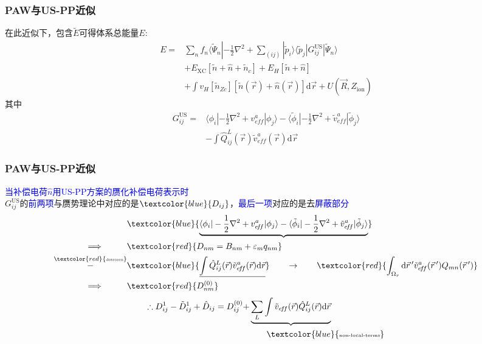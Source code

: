 \frame
{
	\frametitle{\textrm{PAW}与\textrm{US-PP}近似}
	在此近似下，包含$\tilde E$可得体系总能量$E$:
	\begin{displaymath}
		\begin{aligned}
			E=&\sum_nf_n\langle\tilde\Psi_n|-\frac12\nabla^2+\sum_{(ij)}|\tilde p_i\rangle\langle\tilde p_j|G_{ij}^{\mathrm{US}}|\tilde\Psi_n\rangle\\
			&+E_{\mathrm{XC}}[\tilde n+\hat n+\tilde n_c]+E_H[\tilde n+\hat n]\\
			&+\int v_H[\tilde n_{Zc}][\tilde n(\vec r)+\hat n(\vec r)]\mathrm{d}\vec r+U(\vec R,Z_{\mathrm{ion}})
		\end{aligned}
	\end{displaymath}
	其中
	\begin{displaymath}
		\begin{aligned}
			G_{ij}^{\mathrm{US}}=&\langle\phi_i|-\frac12\nabla^2+v_{e\!f\!f}^a|\phi_j\rangle-\langle\tilde\phi_i|-\frac12\nabla^2+\tilde v_{e\!f\!f}^a|\tilde\phi_j\rangle\\
			&-\int\hat Q_{ij}^L(\vec r)\tilde v_{e\!f\!f}^a(\vec r)\mathrm{d}\vec r
		\end{aligned}
	\end{displaymath}
}


\frame
{
	\frametitle{\textrm{PAW}与\textrm{US-PP}近似}
	\textcolor{blue}{当补偿电荷$\hat n$用\textrm{US-PP}方案的赝化补偿电荷表示时}\\%
	$G_{ij}^{\mathrm{US}}$的\textcolor{blue}{前两项}与赝势理论中对应的是$\textcolor{blue}{D_{ij}}$，\textcolor{blue}{最后一项}对应的是去\textcolor{blue}{屏蔽部分}
	\begin{displaymath}
		\begin{aligned}
			&\textcolor{blue}{\underbrace{\langle\phi_i|-\frac12\nabla^2+v_{e\!f\!f}^a|\phi_j\rangle-\langle\tilde\phi_i|-\frac12\nabla^2+\tilde v_{e\!f\!f}^a|\tilde\phi_j\rangle}}\\
			\Longrightarrow\quad\qquad&\textcolor{red}{D_{nm}=B_{nm}+\varepsilon_mq_{nm}} \\
			\overset{\textcolor{red}{\textrm{\fontsize{4.1pt}{3.9pt}\selectfont{desrceen}}}}{-}&\textcolor{blue}{\underline{\int\hat Q_{ij}^L(\vec r)\tilde v_{e\!f\!f}^a(\vec r)\mathrm{d}\vec r}} \qquad\rightarrow\qquad \textcolor{red}{\int_{\Omega_r}\mathrm{d}\vec r\,^{\prime}\tilde v_{e\!f\!f}^a(\vec r\,^{\prime})Q_{mn}(\vec r\,^{\prime})}\\
			\Longrightarrow\quad\qquad&\textcolor{red}{D_{nm}^{(0)}}
		\end{aligned}
	\end{displaymath}
	\begin{displaymath}
		\begin{aligned}
			\therefore D_{ij}^1-\tilde D_{ij}^1+\hat D_{ij}=D_{ij}^{(0)}+&\underbrace{\sum_L\int\tilde v_{e\!f\!f}(\vec r)\hat{Q}_{ij}^L(\vec r)\mathrm{d}\vec r}\\
			&\qquad{\textcolor{blue}{\fontsize{5.2pt}{4.2pt}\selectfont{\textrm{non-local-terms}}}}
		\end{aligned}
	\end{displaymath}
}

